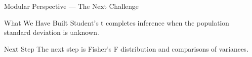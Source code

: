 \documentclass[aspectratio=169,xcolor={dvipsnames,table}]{beamer}
\begin{document}
\begin{frame}{Modular Perspective --- The Next Challenge}
  \small
  \begin{block}{What We Have Built}
    Student's t completes inference when the population standard deviation is unknown.
  \end{block}
  \pause
  \begin{alertblock}{Next Step}
    The next step is Fisher's F distribution and comparisons of variances.
  \end{alertblock}
\end{frame}
\end{document}

